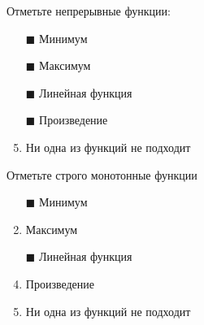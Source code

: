 Отметьте непрерывные функции:
\begin{enumerate}[label=$\square$]	%
	\item[$\blacksquare$] Минимум
	\item[$\blacksquare$] Максимум
	\item[$\blacksquare$] Линейная функция
	\item[$\blacksquare$] Произведение
	\item Ни одна из функций не подходит
\end{enumerate}

\task
Отметьте строго монотонные функции
\begin{enumerate}[label=$\square$]
	
	
	
	
	
	\item[$\blacksquare$] Минимум
	\item Максимум
	\item[$\blacksquare$] Линейная функция
	\item Произведение
	\item Ни одна из функций не подходит
\end{enumerate}

